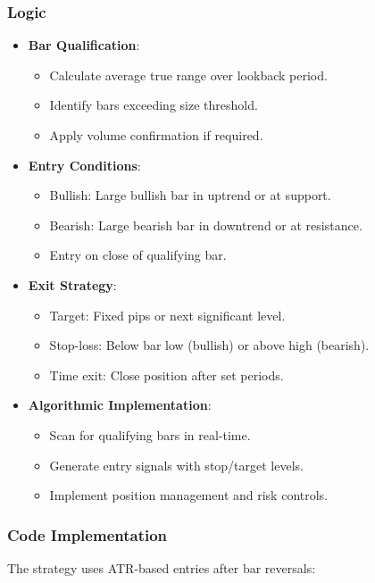 \documentclass[12pt]{article}
\begin{document}
\subsubsection{Logic}
\begin{itemize}
\item \textbf{Bar Qualification}:
  \begin{itemize}
  \item Calculate average true range over lookback period.
  \item Identify bars exceeding size threshold.
  \item Apply volume confirmation if required.
  \end{itemize}
\item \textbf{Entry Conditions}:
  \begin{itemize}
  \item Bullish: Large bullish bar in uptrend or at support.
  \item Bearish: Large bearish bar in downtrend or at resistance.
  \item Entry on close of qualifying bar.
  \end{itemize}
\item \textbf{Exit Strategy}:
  \begin{itemize}
  \item Target: Fixed pips or next significant level.
  \item Stop-loss: Below bar low (bullish) or above high (bearish).
  \item Time exit: Close position after set periods.
  \end{itemize}
\item \textbf{Algorithmic Implementation}:
  \begin{itemize}
  \item Scan for qualifying bars in real-time.
  \item Generate entry signals with stop/target levels.
  \item Implement position management and risk controls.
  \end{itemize}
\end{itemize}

\subsubsection{Code Implementation}
The strategy uses ATR-based entries after bar reversals:
\end{document}
